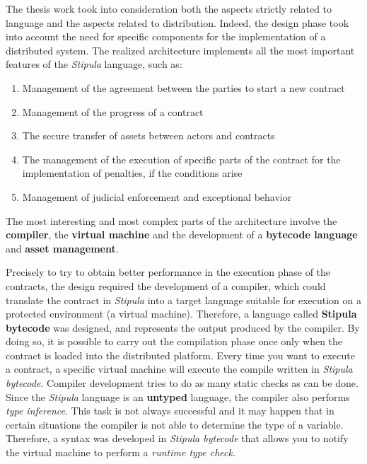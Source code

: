 The thesis work took into consideration both the aspects strictly related to language and the aspects 
related to distribution. Indeed, the design phase took into account the need for specific components for 
the implementation of a distributed system. The realized architecture implements all the most important 
features of the \textit{Stipula} language, such as:
\begin{enumerate}
	\item Management of the agreement between the parties to start a new contract
	\item Management of the progress of a contract
	\item The secure transfer of assets between actors and contracts
	\item The management of the execution of specific parts of the contract for the implementation of 
	penalties, if the conditions arise
	\item Management of judicial enforcement and exceptional behavior
\end{enumerate}
The most interesting and most complex parts of the architecture involve the \textbf{compiler}, the 
\textbf{virtual machine} and the development of a \textbf{bytecode language} and \textbf{asset management}.

Precisely to try to obtain better performance in the execution phase of the contracts, the design required 
the development of a compiler, which could translate the contract in \textit{Stipula} into a target 
language suitable for execution on a protected environment (a virtual machine). Therefore, a language 
called \textbf{Stipula bytecode} was designed, and represents the output produced by the compiler. By 
doing so, it is possible to carry out the compilation phase once only when the contract is loaded into the 
distributed platform. Every time you want to execute a contract, a specific virtual machine will execute 
the compile written in \textit{Stipula bytecode}. Compiler development tries to do as many static checks 
as can be done. Since the \textit{Stipula} language is an \textbf{untyped} language, the compiler also 
performs \textit{type inference}. This task is not always successful and it may happen that in certain 
situations the compiler is not able to determine the type of a variable. Therefore, a syntax was developed 
in \textit{Stipula bytecode} that allows you to notify the virtual machine to perform a 
\textit{runtime type check}.

